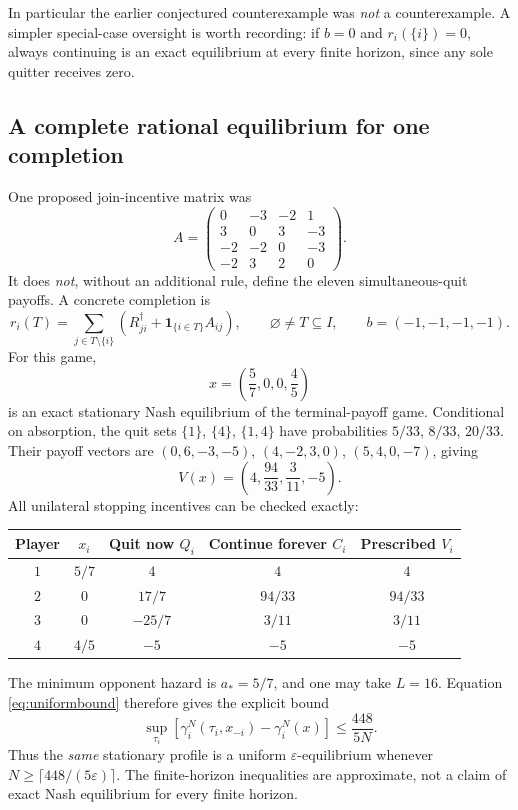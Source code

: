 \documentclass[11pt,a4paper]{article}
\theoremstyle{definition}
\theoremstyle{remark}
\newcommand{\one}{\mathbf{1}}
\begin{document}
In particular the earlier conjectured counterexample was \emph{not} a counterexample. A simpler special-case oversight is worth recording: if $b=0$ and $r_i(\{i\})=0$, always continuing is an exact equilibrium at every finite horizon, since any sole quitter receives zero.

\subsection{A complete rational equilibrium for one completion}\label{sec:example}
One proposed join-incentive matrix was
\[
A=\begin{pmatrix}
0&-3&-2&1\\3&0&3&-3\\-2&-2&0&-3\\-2&3&2&0
\end{pmatrix}.
\]
It does \emph{not}, without an additional rule, define the eleven simultaneous-quit payoffs. A concrete completion is
\begin{equation}\label{eq:completion}
r_i(T)=\sum_{j\in T\setminus\{i\}}
\left(R^\dagger_{ji}+\one_{\{i\in T\}}A_{ij}\right),\qquad \varnothing\ne T\subseteq I,
\qquad b=(-1,-1,-1,-1).
\end{equation}
For this game,
\[
x=\left(\frac57,0,0,\frac45\right)
\]
is an exact stationary Nash equilibrium of the terminal-payoff game. Conditional on absorption, the quit sets $\{1\}$, $\{4\}$, $\{1,4\}$ have probabilities $5/33$, $8/33$, $20/33$. Their payoff vectors are $(0,6,-3,-5)$, $(4,-2,3,0)$, $(5,4,0,-7)$, giving
\begin{equation}\label{eq:explicitpayoff}
V(x)=\left(4,\frac{94}{33},\frac3{11},-5\right).
\end{equation}
All unilateral stopping incentives can be checked exactly:
\begin{center}
\begin{tabular}{ccccc}\toprule
Player & $x_i$ & Quit now $Q_i$ & Continue forever $C_i$ & Prescribed $V_i$\\\midrule
$1$ & $5/7$ & $4$ & $4$ & $4$\\
$2$ & $0$ & $17/7$ & $94/33$ & $94/33$\\
$3$ & $0$ & $-25/7$ & $3/11$ & $3/11$\\
$4$ & $4/5$ & $-5$ & $-5$ & $-5$\\\bottomrule
\end{tabular}
\end{center}
The minimum opponent hazard is $a_*=5/7$, and one may take $L=16$. Equation \eqref{eq:uniformbound} therefore gives the explicit bound
\[
\sup_{\tau_i}\left[\gamma_i^N(\tau_i,x_{-i})-\gamma_i^N(x)\right]\le\frac{448}{5N}.
\]
Thus the \emph{same} stationary profile is a uniform $\varepsilon$-equilibrium whenever $N\ge\lceil448/(5\varepsilon)\rceil$. The finite-horizon inequalities are approximate, not a claim of exact Nash equilibrium for every finite horizon.
\end{document}

